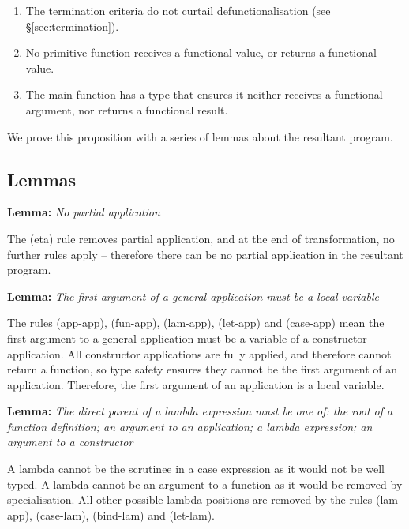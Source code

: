 \documentclass[preprint]{sigplanconf}
\newenvironment{lemma}[1]
    {\smallskip
     \noindent\textbf{Lemma:} \textit{#1}}
    {\noexample}
\begin{document}
\begin{enumerate}
\item The termination criteria do not curtail defunctionalisation (see \S\ref{sec:termination}).
\item No primitive function receives a functional value, or returns a functional value.
\item The main function has a type that ensures it neither receives a functional argument, nor returns a functional result.
\end{enumerate}

We prove this proposition with a series of lemmas about the resultant program.

\subsection{Lemmas}

\begin{lemma}{No partial application}

The (eta) rule removes partial application, and at the end of transformation, no further rules apply -- therefore there can be no partial application in the resultant program.
\end{lemma}

\begin{lemma}{The first argument of a general application must be a local variable}

The rules (app-app), (fun-app), (lam-app), (let-app) and (case-app) mean the first argument to a general application must be a variable of a constructor application. All constructor applications are fully applied, and therefore cannot return a function, so type safety ensures they cannot be the first argument of an application. Therefore, the first argument of an application is a local variable.
\end{lemma}

\begin{lemma}{The direct parent of a lambda expression must be one of: the root of a function definition; an argument to an application; a lambda expression; an argument to a constructor}

A lambda cannot be the scrutinee in a case expression as it would not be well typed. A lambda cannot be an argument to a function as it would be removed by specialisation. All other possible lambda positions are removed by the rules (lam-app), (case-lam), (bind-lam) and (let-lam).
\end{lemma}
\end{document}
